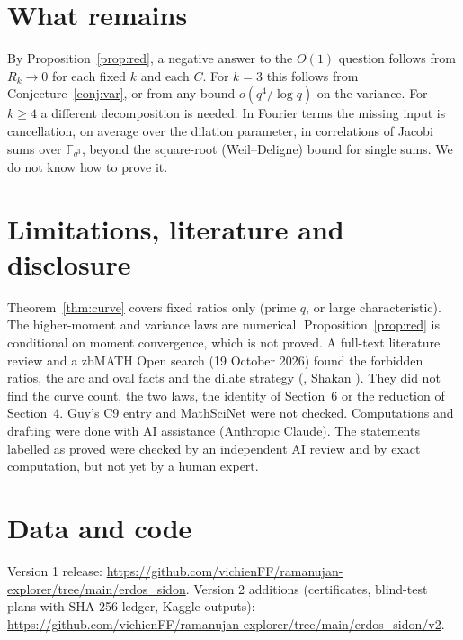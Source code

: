 \documentclass[11pt]{article}
\begin{document}
\section{What remains}\label{sec:rem}
By Proposition~\ref{prop:red}, a negative answer to the $O(1)$ question follows from $R_k\to0$ for each fixed $k$ and each $C$. For $k=3$ this follows
from Conjecture~\ref{conj:var}, or from any bound $o(q^4/\log q)$ on the variance. For $k\ge4$ a different decomposition is needed. In
Fourier terms the missing input is cancellation, on average over the dilation parameter, in correlations of Jacobi sums over
$\mathbb F_{q^3}$, beyond the square-root (Weil--Deligne) bound for single sums. We do not know how to prove it.

\section{Limitations, literature and disclosure}
Theorem~\ref{thm:curve} covers fixed ratios only (prime $q$, or large characteristic). The higher-moment and variance laws are
numerical. Proposition~\ref{prop:red} is conditional on moment convergence, which is not proved. A full-text literature review and a
zbMATH Open search (19 October 2026) found the forbidden ratios, the arc and oval facts \cite{JV,Pi} and the dilate strategy
(\cite{Go}, Shakan \cite{Sh}). They did not find the curve count, the two laws, the identity of Section~6 or the reduction of
Section~4. Guy's C9 entry and MathSciNet were not checked. Computations and drafting were done with AI assistance (Anthropic Claude).
The statements labelled as proved were checked by an independent AI review and by exact computation, but not yet by a human expert.

\section*{Data and code}
Version 1 release: \url{https://github.com/vichienFF/ramanujan-explorer/tree/main/erdos_sidon}. Version 2 additions (certificates,
blind-test plans with SHA-256 ledger, Kaggle outputs): \url{https://github.com/vichienFF/ramanujan-explorer/tree/main/erdos_sidon/v2}.
\end{document}

